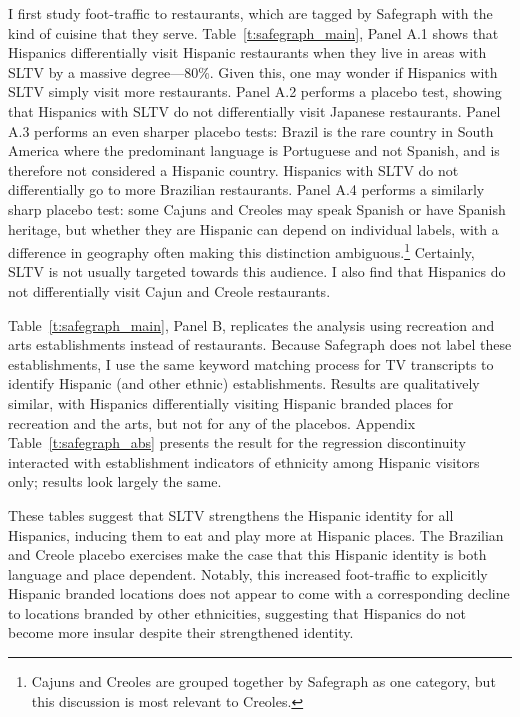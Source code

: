 \documentclass[11pt]{article}
\begin{document}
I first study foot-traffic to restaurants, which are tagged by Safegraph with the kind of cuisine that they serve. Table~\ref{t:safegraph_main}, Panel A.1 shows that Hispanics differentially visit Hispanic restaurants when they live in areas with SLTV by a massive degree---80\%. Given this, one may wonder if Hispanics with SLTV simply visit more restaurants. Panel A.2 performs a placebo test, showing that Hispanics with SLTV do not differentially visit Japanese restaurants. Panel A.3 performs an even sharper placebo tests: Brazil is the rare country in South America where the predominant language is Portuguese and not Spanish, and is therefore not considered a Hispanic country. Hispanics with SLTV do not differentially go to more Brazilian restaurants. Panel A.4 performs a similarly sharp placebo test: some Cajuns and Creoles may speak Spanish or have Spanish heritage, but whether they are Hispanic can depend on individual labels, with a difference in geography often making this distinction ambiguous.\footnote{ Cajuns and Creoles are grouped together by Safegraph as one category, but this discussion is most relevant to Creoles.} Certainly, SLTV is not usually targeted towards this audience. I also find that Hispanics do not differentially visit Cajun and Creole restaurants. 

Table~\ref{t:safegraph_main}, Panel B, replicates the analysis using recreation and arts establishments instead of restaurants. Because Safegraph does not label these establishments, I use the same keyword matching process for TV transcripts to identify Hispanic (and other ethnic) establishments. Results are qualitatively similar, with Hispanics differentially visiting Hispanic branded places for recreation and the arts, but not for any of the placebos. Appendix Table~\ref{t:safegraph_abs} presents the result for the regression discontinuity interacted with establishment indicators of ethnicity among Hispanic visitors only; results look largely the same. 

These tables suggest that SLTV strengthens the Hispanic identity for all Hispanics, inducing them to eat and play more at Hispanic places. The Brazilian and Creole placebo exercises make the case that this Hispanic identity is both language and place dependent. Notably, this increased foot-traffic to explicitly Hispanic branded locations does not appear to come with a corresponding decline to locations branded by other ethnicities, suggesting that Hispanics do not become more insular despite their strengthened identity.
\end{document}
